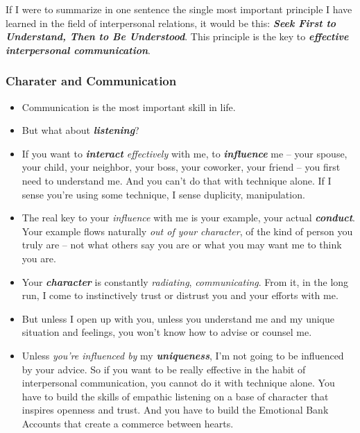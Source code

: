 \documentclass[11pt]{article}
\begin{document}
If I were to summarize in one sentence the single most important principle I have learned in the field of interpersonal relations, it would be this: \emph{\textbf{Seek First to Understand, Then to Be Understood}}. This principle is the key to \emph{\textbf{effective interpersonal communication}}.
\subsubsection{Charater and Communication}
\begin{itemize}
\item Communication is the most important skill in life. 

\item But what about \emph{\textbf{listening}}? 

\item If you want to \emph{\textbf{interact} effectively} with me, to \emph{\textbf{influence}} me -- your spouse, your child, your neighbor, your boss, your coworker, your friend -- you first need to understand me. And you can't do that with technique alone. If I sense you're using some technique, I sense duplicity, manipulation.

\item The real key to your \emph{influence} with me is your example, your actual \emph{\textbf{conduct}}. Your example flows naturally \emph{out of your character}, of the kind of person you truly are -- not what others say you are or what you may want me to think you are.

\item Your \emph{\textbf{character}} is constantly \emph{radiating}, \emph{communicating}. From it, in the long run, I come to instinctively trust or distrust you and your efforts with me.

\item But unless I open up with you, unless you understand me and my unique situation and feelings, you won't know how to advise or counsel me.

\item Unless \emph{you're influenced by} my \emph{\textbf{uniqueness}}, I'm not going to be influenced by your advice. So if you want to be really effective in the habit of interpersonal communication, you cannot do it with technique alone. You have to build the skills of empathic listening on a base of character that inspires openness and trust. And you have to build the Emotional Bank Accounts that create a commerce between hearts.
\end{itemize}
\end{document}
